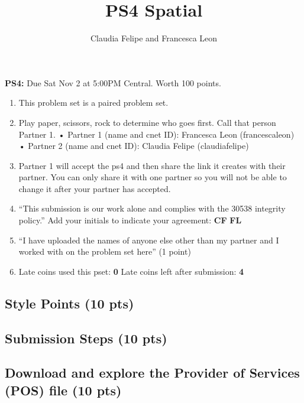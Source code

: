 \documentclass[
  letterpaper,
  DIV=11,
  numbers=noendperiod]{scrartcl}
\title{PS4 Spatial}
\author{Claudia Felipe and Francesca Leon}
\date{}
\providecommand{\tightlist}{%
  \setlength{\itemsep}{0pt}\setlength{\parskip}{0pt}}\usepackage{longtable,booktabs,array}
\begin{document}
\maketitle



\textbf{PS4:} Due Sat Nov 2 at 5:00PM Central. Worth 100 points.

\begin{enumerate}
\def\labelenumi{\arabic{enumi}.}
\tightlist
\item
  This problem set is a paired problem set.
\item
  Play paper, scissors, rock to determine who goes first. Call that
  person Partner 1. • Partner 1 (name and cnet ID): Francesca Leon
  (francescaleon) • Partner 2 (name and cnet ID): Claudia Felipe
  (claudiafelipe)
\item
  Partner 1 will accept the ps4 and then share the link it creates with
  their partner. You can only share it with one partner so you will not
  be able to change it after your partner has accepted.
\item
  ``This submission is our work alone and complies with the 30538
  integrity policy.'' Add your initials to indicate your agreement:
  \textbf{CF} \textbf{FL}
\item
  ``I have uploaded the names of anyone else other than my partner and I
  worked with on the problem set here'' (1 point)
\item
  Late coins used this pset: \textbf{0} Late coins left after
  submission: \textbf{4}
\end{enumerate}

\subsection{Style Points (10 pts)}\label{style-points-10-pts}

\subsection{Submission Steps (10 pts)}\label{submission-steps-10-pts}

\subsection{Download and explore the Provider of Services (POS) file (10
pts)}\label{download-and-explore-the-provider-of-services-pos-file-10-pts}
\end{document}
